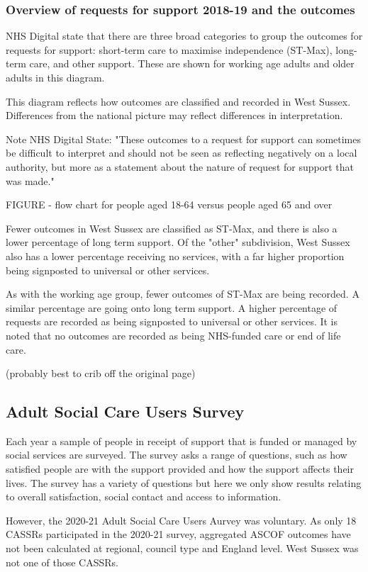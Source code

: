 \subsubsection{Overview of requests for support 2018-19 and the outcomes}
NHS Digital state that there are three broad categories to group the outcomes for requests for support: short-term care to maximise independence (ST-Max), long-term care, and other support. These are shown for working age adults and older adults in this diagram.

This diagram reflects how outcomes are classified and recorded in West Sussex. Differences from the national picture may reflect differences in interpretation.

Note NHS Digital State: "These outcomes to a request for support can sometimes be difficult to interpret and should not be seen as reflecting negatively on a local authority, but more as a statement about the nature of request for support that was made."

FIGURE - flow chart for people aged 18-64 versus people aged 65 and over

Fewer outcomes in West Sussex are classified as ST-Max, and there is also a lower percentage of long term support. Of the "other" subdivision, West Sussex also has a lower percentage receiving no services, with a far higher proportion being signposted to universal or other services.

As with the working age group, fewer outcomes of ST-Max are being recorded. A similar percentage are going onto long term support. A higher percentage of requests are recorded as being signposted to universal or other services. It is noted that no outcomes are recorded as being NHS-funded care or end of life care.

(probably best to crib off the original page)

\subsection{Adult Social Care Users Survey}
Each year a sample of people in receipt of support that is funded or managed by social services are surveyed. The survey asks a range of questions, such as how satisfied people are with the support provided and how the support affects their lives. The survey has a variety of questions but here we only show results relating to overall satisfaction, social contact and access to information.

However, the 2020-21 Adult Social Care Users Aurvey was voluntary. As only 18 CASSRs participated in the 2020-21 survey, aggregated ASCOF outcomes have not been calculated at regional, council type and England level. West Sussex was not one of those CASSRs.

